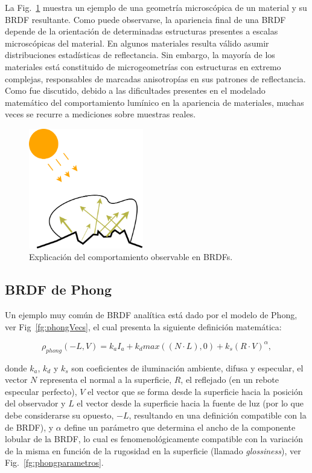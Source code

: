 La Fig.~\ref{fg:microestructura} muestra un ejemplo de una geometría microscópica de un material y su BRDF resultante.
Como puede observarse, la apariencia final de una BRDF depende de la orientación de determinadas estructuras presentes a escalas microscópicas del material.
En algunos materiales resulta válido asumir distribuciones estadísticas de reflectancia.
Sin embargo, la mayoría de los materiales está constituido de microgeometrías con estructuras en extremo complejas, responsables de marcadas anisotropías en sus patrones de reflectancia.
Como fue discutido, debido a las dificultades presentes en el modelado matemático del comportamiento lumínico en la apariencia de materiales, muchas veces se recurre a mediciones sobre muestras reales.


\begin{figure}
\center
\includegraphics[width=5cm]{figures/microestructura}
\caption{Explicación del comportamiento observable en BRDFs.}
\label{fg:microestructura}
\end{figure}


\subsection{BRDF de Phong}
Un ejemplo muy común de BRDF analítica está dado por el modelo de Phong, ver Fig~\ref{fg:phongVecs}, el cual presenta la siguiente definición matemática:

$$\rho_{phong}(-L,V) =  k_{a} I_{a} + k_{d} max((N \cdot L),0) + k_{s} (R \cdot V)^{\alpha},$$

\noindent donde $k_{a}$, $k_{d}$ y $k_{s}$ son coeficientes de iluminación ambiente, difusa y especular, el vector $N$ representa el normal a la superficie, $R$, el reflejado (en un rebote especular perfecto), $V$ el vector que se forma desde la superficie hacia la posición del observador y $L$ el vector desde la superficie hacia la fuente de luz (por lo que debe considerarse su opuesto, $-L$, resultando en una definición compatible con la de BRDF), y $\alpha$ define un parámetro que determina el ancho de la componente lobular de la BRDF, lo cual es fenomenológicamente compatible con la variación de la misma en función de la rugosidad en la superficie (llamado {\em glossiness}), ver Fig.~\ref{fg:phongparametros}.


